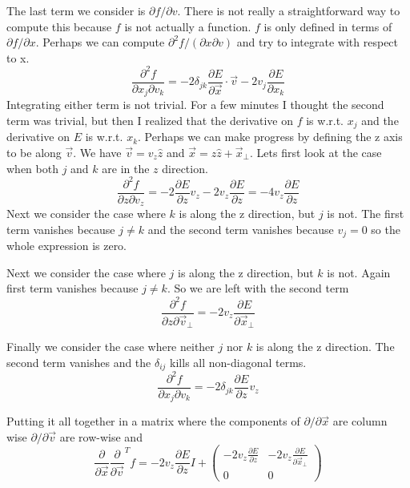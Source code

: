 \documentclass[a4paper]{article}
\begin{document}
The last term we consider is $\partial f / \partial v$.  There is not really a
straightforward way to compute this because $f$ is not actually a function.
$f$ is only defined in terms of $\partial f / \partial x$.  Perhaps we can
compute $\partial^2 f / (\partial x \partial v)$ and try to integrate with
respect to x.
\begin{equation}
\frac{\partial^2 f}{\partial {x_j} \partial {v_k}} = 
- 2 \delta_{jk} \frac{\partial E}{\partial \vec{x}} \cdot \vec{v}
- 2 {v_j} \frac{\partial E}{\partial {x_k}}
\end{equation}
Integrating either term is not trivial.  For a few minutes I thought the second term was trivial, but then 
I realized that the derivative on $f$ is w.r.t. $x_j$ and the derivative on $E$ is w.r.t. $x_k$.
Perhaps we can make progress by defining the z axis to be along $\vec{v}$.  We have
$\vec{v} = v_z \hat{z}$ and $\vec{x} = z \hat{z} + \vec{x}_\perp$.
Lets first look at the case when both $j$ and $k$ are in the $z$ direction.
\begin{equation}
\frac{\partial^2 f}{\partial {z} \partial {v_z}} = 
- 2 \frac{\partial E}{\partial z} v_z
- 2 {v_z} \frac{\partial E}{\partial z}
=
- 4 {v_z} \frac{\partial E}{\partial z}
\end{equation}
Next we consider the case where $k$ is along the z direction, but $j$ is not.
The first term vanishes because $j \ne k$ and the second term vanishes because $v_j = 0$ so the whole
expression is zero.

Next we consider the case where $j$ is along the z direction, but $k$ is not.
Again first term vanishes because $j \ne k$.  So we are left with the second term
\begin{equation}
\frac{\partial^2 f}{\partial {z} \partial \vec{v}_\perp} = 
- 2 {v_z} \frac{\partial E}{\partial \vec{x}_\perp}
\end{equation}

Finally we consider the case where neither $j$ nor $k$ is along the z direction.
The second term vanishes and the $\delta_{ij}$ kills all non-diagonal terms.
\begin{equation}
\frac{\partial^2 f}{\partial {x_j} \partial {v_k}} = 
- 2 \delta_{jk} \frac{\partial E}{\partial z} v_z
\end{equation}

Putting it all together in a matrix where the components of 
$\partial / \partial \vec{x}$ are column wise
$\partial / \partial \vec{v}$ are row-wise and
\begin{equation}
\frac{\partial}{\partial \vec{x}} 
\frac{\partial}{\partial \vec{v}}^{T}
f = 
- 2 v_z \frac{\partial E}{\partial z}  I +
\begin{pmatrix}
- 2 v_z \frac{\partial E}{\partial z}
& 
- 2 {v_z} \frac{\partial E}{\partial \vec{x}_\perp}
 \\
0 & 0 
\end{pmatrix}
\end{equation}
\end{document}
